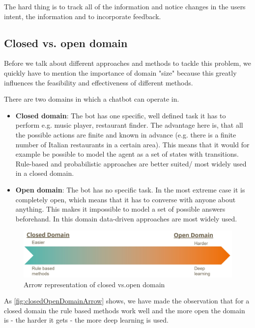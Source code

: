 \documentclass[conference]{IEEEtran}
\begin{document}
The hard thing is to track all of the information and notice changes in the users intent, the information and to incorporate feedback.

\subsection{Closed vs. open domain}
Before we talk about different approaches and methods to tackle this problem, we quickly have to mention the importance of domain "size" because this greatly influences the feasibility and effectiveness of different methods.

There are two domains\cite{yan2016shall} in which a chatbot can operate in.
\begin{itemize}
\item{\textbf{Closed domain}: The bot has one specific, well defined task it has to perform e.g. music player, restaurant finder. The advantage here is, that all the possible actions are finite and known in advance\cite{radlinski2017theoretical} (e.g. there is a finite number of Italian restaurants in a certain area). This means that it would for example be possible to model the agent as a set of states with transitions. Rule-based and probabilistic approaches are better suited/ most widely used in a closed domain.}
\item{\textbf{Open domain}: The bot has no specific task. In the most extreme case it is completely open, which means that it has to converse with anyone about anything. This makes it impossible to model a set of possible answers beforehand. In this domain data-driven approaches are most widely used.}
\end{itemize}

\begin{figure}[H]
\centering
   \includegraphics[width=\linewidth]{closedOpenDomainArrow.jpg}
  \caption{Arrow representation of closed vs.open domain}
  \label{fig:closedOpenDomainArrow}
\end{figure}

As \autoref{fig:closedOpenDomainArrow} shows, we have made the observation that for a closed domain the rule based methods work well and the more open the domain is - the harder it gets - the more deep learning is used.
\end{document}

